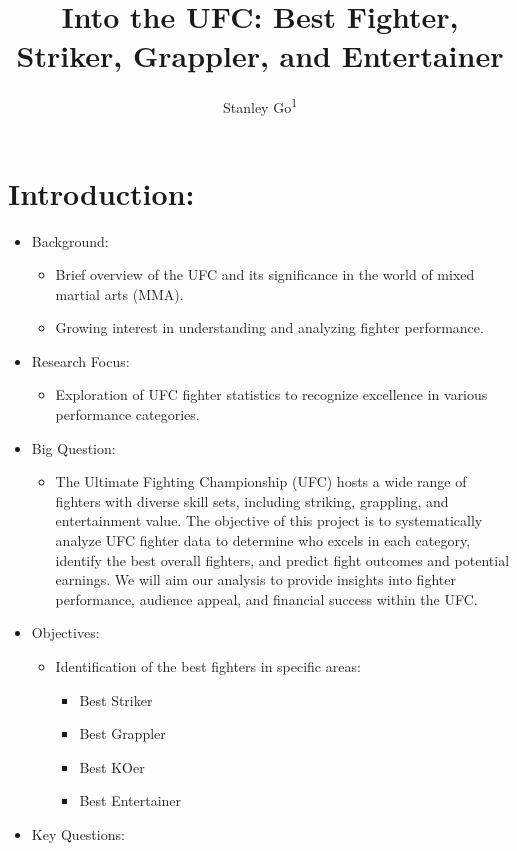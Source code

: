 \documentclass[
  man,floatsintext]{apa6}
\title{Into the UFC: Best Fighter, Striker, Grappler, and Entertainer}
\author{Stanley Go\textsuperscript{1}}
\date{}
\affiliation{\vspace{0.5cm}\textsuperscript{1} Rutgers University}
\providecommand{\tightlist}{%
  \setlength{\itemsep}{0pt}\setlength{\parskip}{0pt}}
\begin{document}
\maketitle

\hypertarget{introduction}{%
\section{Introduction:}\label{introduction}}

\begin{itemize}
\tightlist
\item
  Background:

  \begin{itemize}
  \tightlist
  \item
    Brief overview of the UFC and its significance in the world of mixed martial arts (MMA).
  \item
    Growing interest in understanding and analyzing fighter performance.
  \end{itemize}
\item
  Research Focus:

  \begin{itemize}
  \tightlist
  \item
    Exploration of UFC fighter statistics to recognize excellence in various performance categories.
  \end{itemize}
\item
  Big Question:

  \begin{itemize}
  \tightlist
  \item
    The Ultimate Fighting Championship (UFC) hosts a wide range of fighters with diverse skill sets, including striking, grappling, and entertainment value. The objective of this project is to systematically analyze UFC fighter data to determine who excels in each category, identify the best overall fighters, and predict fight outcomes and potential earnings. We will aim our analysis to provide insights into fighter performance, audience appeal, and financial success within the UFC.
  \end{itemize}
\item
  Objectives:

  \begin{itemize}
  \tightlist
  \item
    Identification of the best fighters in specific areas:

    \begin{itemize}
    \tightlist
    \item
      Best Striker
    \item
      Best Grappler
    \item
      Best KOer
    \item
      Best Entertainer
    \end{itemize}
  \end{itemize}
\item
  Key Questions:


\end{itemize}
\end{document}
